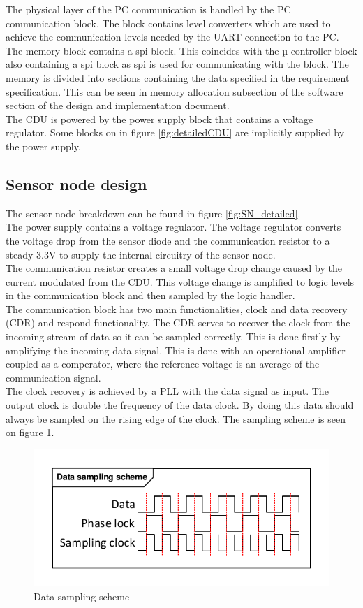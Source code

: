 The physical layer of the PC communication is handled by the PC communication block. The block contains level converters which are used to achieve the communication levels needed by the UART connection to the PC.\\
The memory block contains a spi block. This coincides with the µ-controller block also containing a spi block as spi is used for communicating with the block. The memory is divided into sections containing the data specified in the requirement specification. This can be seen in memory allocation subsection of the software section of the design and implementation document.\\
The CDU is powered by the power supply block that contains a voltage regulator. Some blocks on in figure \ref{fig:detailedCDU} are implicitly supplied by the power supply.
\subsection{Sensor node design}
The sensor node breakdown can be found in figure \ref{fig:SN_detailed}.\\
The power supply contains a voltage regulator. The voltage regulator converts the voltage drop from the sensor diode and the communication resistor to a steady 3.3V to supply the internal circuitry of the sensor node.\\
The communication resistor creates a small voltage drop change caused by the current modulated from the CDU. This voltage change is amplified to logic levels in the communication block and then sampled by the logic handler.\\
The communication block has two main functionalities, clock and data recovery (CDR) and respond functionality. The CDR serves to recover the clock from the incoming stream of data so it can be sampled correctly. This is done firstly by amplifying the incoming data signal. This is done with an operational amplifier coupled as a comperator, where the reference voltage is an average of the communication signal.\\
The clock recovery is achieved by a PLL with the data signal as input. The output clock is double the frequency of the data clock. By doing this data should always be sampled on the rising edge of the clock. The sampling scheme is seen on figure \ref{fig:datasamp}.
\begin{figure}[H]
	\centering
	\includegraphics[width=.7\textwidth]{billeder/11projectdescription/datasampling}
	\caption{Data sampling scheme}
	\label{fig:datasamp}
\end{figure}
